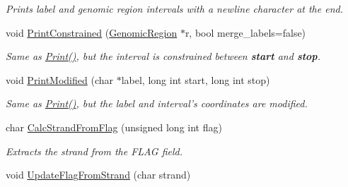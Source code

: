 \begin{CompactItemize}
\begin{CompactList}\small\item\em Prints label and genomic region intervals with a newline character at the end. \item\end{CompactList}\item 
\hypertarget{classGenomicRegionSAM_df8beab78f541121e7b56957afffa4ac}{
void \hyperlink{classGenomicRegionSAM_df8beab78f541121e7b56957afffa4ac}{PrintConstrained} (\hyperlink{classGenomicRegion}{GenomicRegion} $\ast$r, bool merge\_\-labels=false)}
\label{classGenomicRegionSAM_df8beab78f541121e7b56957afffa4ac}

\begin{CompactList}\small\item\em Same as \hyperlink{classGenomicRegionSAM_4381c6486f767b6e4055cb729beee181}{Print()}, but the interval is constrained between {\bf start} and {\bf stop}. \item\end{CompactList}\item 
\hypertarget{classGenomicRegionSAM_ecf1d74c572e85bbe9bca0b30c6a6dda}{
void \hyperlink{classGenomicRegionSAM_ecf1d74c572e85bbe9bca0b30c6a6dda}{PrintModified} (char $\ast$label, long int start, long int stop)}
\label{classGenomicRegionSAM_ecf1d74c572e85bbe9bca0b30c6a6dda}

\begin{CompactList}\small\item\em Same as \hyperlink{classGenomicRegionSAM_4381c6486f767b6e4055cb729beee181}{Print()}, but the label and interval's coordinates are modified. \item\end{CompactList}\item 
\hypertarget{classGenomicRegionSAM_6d0949a836520073de57e0f968a6b819}{
char \hyperlink{classGenomicRegionSAM_6d0949a836520073de57e0f968a6b819}{CalcStrandFromFlag} (unsigned long int flag)}
\label{classGenomicRegionSAM_6d0949a836520073de57e0f968a6b819}

\begin{CompactList}\small\item\em Extracts the strand from the FLAG field. \item\end{CompactList}\item 
\hypertarget{classGenomicRegionSAM_f583a963f7fb0eb071c1b640c660813a}{
void \hyperlink{classGenomicRegionSAM_f583a963f7fb0eb071c1b640c660813a}{UpdateFlagFromStrand} (char strand)}
\label{classGenomicRegionSAM_f583a963f7fb0eb071c1b640c660813a}


\end{CompactItemize}
